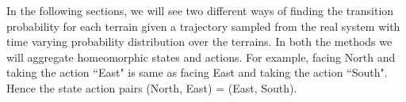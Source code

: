 \documentclass{article}[11pt]
\begin{document}






In the following sections, we will see two different ways of finding the transition probability for each terrain given a trajectory sampled from the real system with time varying probability distribution over the terrains. In both the methods we will aggregate homeomorphic states and actions. For example, facing North and taking the action ``East" is same as facing East and taking the action ``South". Hence the state action pairs (North, East) = (East, South). 
\end{document}
